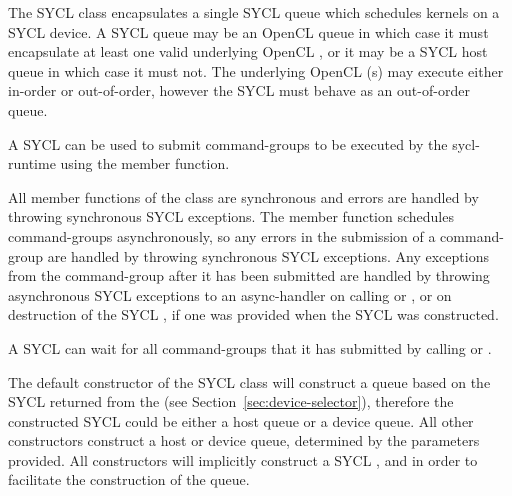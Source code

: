 %



The SYCL  class encapsulates a single SYCL queue which
schedules kernels on a SYCL device. A SYCL queue may be an OpenCL queue in
which case it must encapsulate at least one valid underlying OpenCL
, or it may be a SYCL host queue in which case it
must not. The underlying OpenCL (s) may execute 
either in-order or out-of-order, however the SYCL 
must behave as an out-of-order queue.

A SYCL  can be used to submit \glspl{command-group} to be
executed by the \gls{sycl-runtime} using the  member
function.

All member functions of the  class are synchronous and errors
are handled by throwing synchronous SYCL exceptions. The 
member function schedules \glspl{command-group} asynchronously, so any errors
in the submission of a \gls{command-group} are handled by throwing synchronous
SYCL exceptions. Any exceptions from the \gls{command-group} after it has
been submitted are handled by throwing asynchronous SYCL exceptions to an
\gls{async-handler} on calling  or , or on destruction of the SYCL , if one was
provided when the SYCL  was constructed.

A SYCL  can wait for all \glspl{command-group} that it has
submitted by calling  or .

The default constructor of the SYCL  class will construct a
queue based on the SYCL  returned from the  (see Section~\ref{sec:device-selector}), therefore
the constructed SYCL  could be either a host queue or a device
queue. All other constructors construct a host or device queue, determined by the
parameters provided. All constructors will implicitly construct a SYCL
,  and  in order to
facilitate the construction of the queue.

